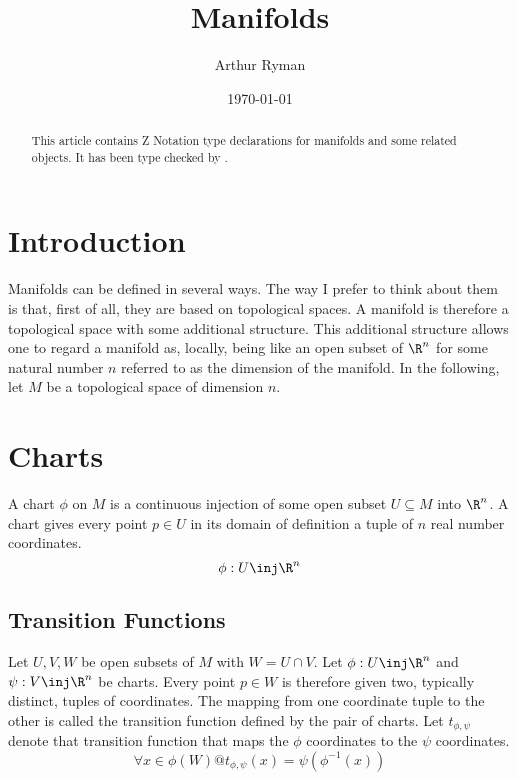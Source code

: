\documentclass{amsart}
\begin{document}
\title{Manifolds}
\author{Arthur Ryman}
\date{\today}

\begin{abstract}
This article contains Z Notation type declarations for manifolds and some related objects.
It has been type checked by \fuzz.
\end{abstract}

\maketitle

\tableofcontents


    \section{Introduction}

    Manifolds can be defined in several ways.
    The way I prefer to think about them is that, first of all, they are  based on topological spaces.
    A manifold is therefore a topological space with some additional structure.
    This additional structure allows one to regard a manifold as, locally, being like an open subset of $\R^n$
    for some natural number $n$ referred to as the dimension of the manifold.
    In the following, let $M$ be a topological space of dimension $n$.

    \section{Charts}
    A chart $\phi$ on $M$ is a continuous injection of some open subset $U \subseteq M$ into $\R^n$.
    A chart gives every point $p \in U$ in its domain of definition a tuple of $n$ real number coordinates.
    \begin{equation}
        \phi: U \inj \R^n
    \end{equation}

    \subsection{Transition Functions}
    Let $U, V, W$ be open subsets of $M$ with $W = U \cap V$.
    Let $\phi: U \inj \R^n$ and $\psi: V \inj \R^n$ be charts.
    Every point $p \in W$ is therefore given two, typically distinct, tuples of coordinates.
    The mapping from one coordinate tuple to the other is called the transition function defined by the pair of charts.
    Let $t_{\phi,\psi}$ denote that transition function that maps the $\phi$ coordinates to the $\psi$ coordinates.
    \begin{equation}
        \forall x \in \phi(W) @ t_{\phi,\psi}(x) = \psi(\phi^{-1}(x))
    \end{equation}
\end{document}

